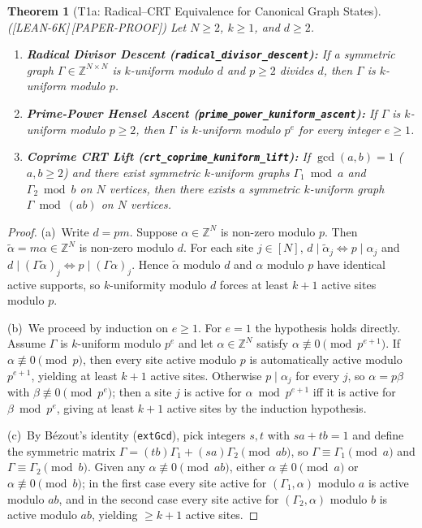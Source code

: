 \documentclass[11pt,reqno]{amsart}
\newtheorem{theorem}{Theorem}[section]
\theoremstyle{definition}
\newcommand{\ZZ}{\mathbb{Z}}
\newcommand{\lid}[1]{{\footnotesize\nolinkurl{#1}}}
\newcommand{\tagL}{\textsf{\footnotesize[LEAN-6K]}}
\newcommand{\tagP}{\textsf{\footnotesize[PAPER-PROOF]}}
\begin{document}
\begin{theorem}[T1a: Radical--CRT Equivalence for Canonical Graph States]
\label{thm:t1a}
\textup{(\tagL\,\tagP)}
Let $N \ge 2$, $k \ge 1$, and $d \ge 2$.
\begin{enumerate}[label=(\alph*)]
  \item \textbf{Radical Divisor Descent (\lid{radical_divisor_descent}):} If a symmetric
    graph $\Gamma \in \ZZ^{N\times N}$ is $k$-uniform modulo $d$ and $p \ge 2$ divides $d$,
    then $\Gamma$ is $k$-uniform modulo $p$.
  \item \textbf{Prime-Power Hensel Ascent (\lid{prime_power_kuniform_ascent}):} If
    $\Gamma$ is $k$-uniform modulo $p \ge 2$, then $\Gamma$ is $k$-uniform modulo $p^e$
    for every integer $e \ge 1$.
  \item \textbf{Coprime CRT Lift (\lid{crt_coprime_kuniform_lift}):} If $\gcd(a,b) = 1$
    ($a, b \ge 2$) and there exist symmetric $k$-uniform graphs $\Gamma_1 \bmod a$ and
    $\Gamma_2 \bmod b$ on $N$ vertices, then there exists a symmetric $k$-uniform graph
    $\Gamma \bmod (ab)$ on $N$ vertices.
\end{enumerate}
\end{theorem}

\begin{proof}
(a)~Write $d = p m$. Suppose $\alpha \in \ZZ^N$ is non-zero modulo $p$. Then
$\tilde{\alpha} = m\alpha \in \ZZ^N$ is non-zero modulo $d$. For each site $j \in [N]$,
$d \mid \tilde{\alpha}_j \iff p \mid \alpha_j$ and $d \mid (\Gamma \tilde{\alpha})_j
\iff p \mid (\Gamma \alpha)_j$. Hence $\tilde{\alpha}$ modulo $d$ and $\alpha$ modulo $p$
have identical active supports, so $k$-uniformity modulo $d$ forces at least $k+1$ active
sites modulo $p$.

(b)~We proceed by induction on $e \ge 1$. For $e = 1$ the hypothesis holds directly.
Assume $\Gamma$ is $k$-uniform modulo $p^e$ and let $\alpha \in \ZZ^N$ satisfy
$\alpha \not\equiv 0 \pmod{p^{e+1}}$. If $\alpha \not\equiv 0 \pmod p$, then every site
active modulo $p$ is automatically active modulo $p^{e+1}$, yielding at least $k+1$
active sites. Otherwise $p \mid \alpha_j$ for every $j$, so $\alpha = p\beta$ with
$\beta \not\equiv 0 \pmod{p^e}$; then a site $j$ is active for $\alpha \bmod p^{e+1}$ iff
it is active for $\beta \bmod p^e$, giving at least $k+1$ active sites by the induction
hypothesis.

(c)~By B\'ezout's identity (\lid{extGcd}), pick integers $s, t$ with $sa + tb = 1$ and
define the symmetric matrix $\Gamma = (tb)\Gamma_1 + (sa)\Gamma_2 \pmod{ab}$, so
$\Gamma \equiv \Gamma_1 \pmod a$ and $\Gamma \equiv \Gamma_2 \pmod b$. Given any
$\alpha \not\equiv 0 \pmod{ab}$, either $\alpha \not\equiv 0 \pmod a$ or
$\alpha \not\equiv 0 \pmod b$; in the first case every site active for $(\Gamma_1, \alpha)$
modulo $a$ is active modulo $ab$, and in the second case every site active for
$(\Gamma_2, \alpha)$ modulo $b$ is active modulo $ab$, yielding $\ge k+1$ active sites.
\end{proof}
\end{document}
